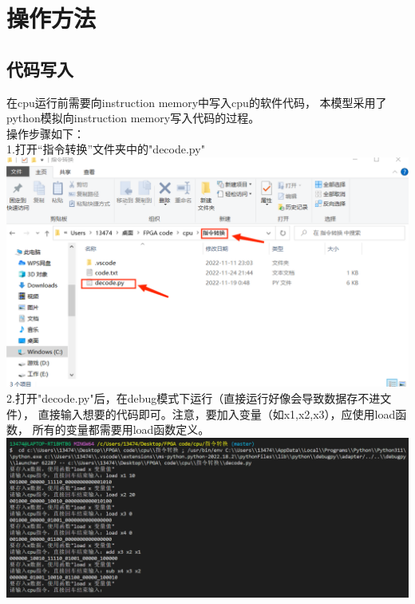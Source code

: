 \documentclass{article}
\newcommand{\tab}{\makebox[2em][l]{}}   %
\begin{document}

{\centering\section {操作方法}}

   \subsection{代码写入}
   \begin{flushleft}
   \tab 在cpu运行前需要向instruction memory中写入cpu的软件代码，
   本模型采用了python模拟向instruction memory写入代码的过程。\\
   \tab 操作步骤如下：\\
   \tab 1.打开“指令转换”文件夹中的"decode.py"\\
   \mbox{} \hfill{\includegraphics[scale=0.3]{3.png}}\hfill \mbox{}\\
   \tab 2.打开"decode.py"后，在debug模式下运行（直接运行好像会导致数据存不进文件），
   直接输入想要的代码即可。注意，要加入变量（如x1,x2,x3），应使用load函数，
   所有的变量都需要用load函数定义。\\
   \mbox{} \hfill{\includegraphics[scale=0.4]{4.png}}\hfill \mbox{}\\

\end{flushleft}
\end{document}
